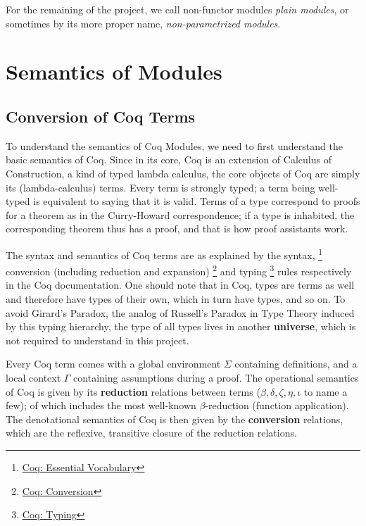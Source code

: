 For the remaining of the project, we call non-functor modules \emph{plain
modules}, or sometimes by its more proper name, \emph{non-parametrized modules}.


\section{Semantics of Modules}
\label{sec:semantics-of-modules}
\subsection{Conversion of Coq Terms}

To understand the semantics of Coq Modules, we need to first understand the
basic semantics of Coq. Since in its core, Coq is an extension of Calculus of
Construction, a kind of typed lambda calculus, the core objects of Coq are
simply its (lambda-calculus) terms. Every term is strongly typed; a term being
well-typed is equivalent to saying that it is valid. Terms of a type correspond
to proofs for a theorem as in the Curry-Howard correspondence; if a type is
inhabited, the corresponding theorem thus has a proof, and that is how proof
assistants work. 

The syntax and semantics of Coq terms are as explained by the syntax,
\footnote{\href{https://coq.inria.fr/refman/language/core/basic.html\#essential-vocabulary}
{Coq: Essential Vocabulary}} conversion (including reduction and expansion)
\footnote{\href{https://coq.inria.fr/refman/language/core/conversion.html} {Coq:
Conversion}} and typing
\footnote{\href{https://coq.inria.fr/refman/language/cic.html} {Coq: Typing}}
rules respectively in the Coq documentation. One should note that in Coq, types
are terms as well and therefore have types of their own, which in turn have
types, and so on. To avoid Girard's Paradox, the analog of Russell's Paradox in
Type Theory induced by this typing hierarchy, the type of all types lives in
another \textbf{universe}, which is not required to understand in this project.

Every Coq term comes with a global environment $\Sigma$ containing definitions,
and a local context $\Gamma$ containing assumptions during a proof. The
operational semantics of Coq is given by its \textbf{reduction} relations
between terms ($\beta, \delta,\zeta,\eta,\iota$ to name a few); of which
includes the most well-known $\beta$-reduction (function application). The
denotational semantics of Coq is then given by the \textbf{conversion}
relations, which are the reflexive, transitive closure of the reduction
relations.

